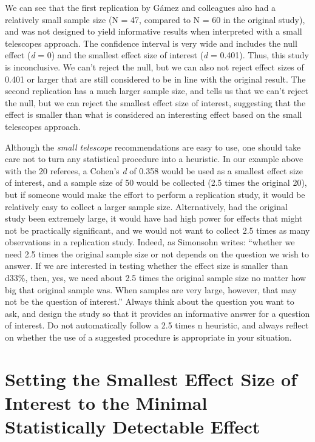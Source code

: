 \documentclass[
  oneside]{krantz}
\begin{document}
We can see that the first replication by Gámez and colleagues also had a relatively small sample size (N = 47, compared to N = 60 in the original study), and was not designed to yield informative results when interpreted with a small telescopes approach. The confidence interval is very wide and includes the null effect (\emph{d} = 0) and the smallest effect size of interest (\emph{d} = 0.401). Thus, this study is inconclusive. We can't reject the null, but we can also not reject effect sizes of 0.401 or larger that are still considered to be in line with the original result. The second replication has a much larger sample size, and tells us that we can't reject the null, but we can reject the smallest effect size of interest, suggesting that the effect is smaller than what is considered an interesting effect based on the small telescopes approach.

Although the \emph{small telescope} recommendations are easy to use, one should take care not to turn any statistical procedure into a heuristic. In our example above with the 20 referees, a Cohen's \emph{d} of 0.358 would be used as a smallest effect size of interest, and a sample size of 50 would be collected (2.5 times the original 20), but if someone would make the effort to perform a replication study, it would be relatively easy to collect a larger sample size. Alternatively, had the original study been extremely large, it would have had high power for effects that might not be practically significant, and we would not want to collect 2.5 times as many observations in a replication study. Indeed, as Simonsohn writes: ``whether we need 2.5 times the original sample size or not depends on the question we wish to answer. If we are interested in testing whether the effect size is smaller than d33\%, then, yes, we need about 2.5 times the original sample size no matter how big that original sample was. When samples are very large, however, that may not be the question of interest.'' Always think about the question you want to ask, and design the study so that it provides an informative answer for a question of interest. Do not automatically follow a 2.5 times n heuristic, and always reflect on whether the use of a suggested procedure is appropriate in your situation.

\hypertarget{setting-the-smallest-effect-size-of-interest-to-the-minimal-statistically-detectable-effect}{%
\section{Setting the Smallest Effect Size of Interest to the Minimal Statistically Detectable Effect}\label{setting-the-smallest-effect-size-of-interest-to-the-minimal-statistically-detectable-effect}}
\end{document}
